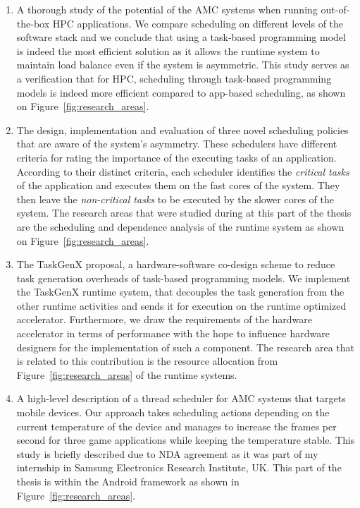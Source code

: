 \begin{enumerate}
	\item A thorough study of the potential of the AMC systems when running out-of-the-box HPC applications.
	We compare scheduling on different levels of the software stack and we conclude that using a task-based programming model is indeed the most efficient solution as it allows the runtime system to maintain load balance even if the system is asymmetric.
	This study serves as a verification that for HPC, scheduling through task-based programming models is indeed more efficient compared to app-based scheduling, as shown on Figure~\ref{fig:research_areas}.
	\item The design, implementation and evaluation of three novel scheduling policies that are aware of the system's asymmetry.
	These schedulers have different criteria for rating the importance of the executing tasks of an application.
	According to their distinct criteria, each scheduler identifies the \textit{critical tasks} of the application and executes them on the fast cores of the system. 
	They then leave the \textit{non-critical tasks} to be executed by the slower cores of the system.
	The research areas that were studied during at this part of the thesis are the scheduling and dependence analysis of the runtime system as shown on Figure~\ref{fig:research_areas}.
	\item The TaskGenX proposal, a hardware-software co-design scheme to reduce task generation overheads of task-based programming models.
	We implement the TaskGenX runtime system, that decouples the task generation from the other runtime activities and sends it for execution on the runtime optimized accelerator.
	Furthermore, we draw the requirements of the hardware accelerator in terms of performance with the hope to influence hardware designers for the implementation of such a component.
	The research area that is related to this contribution is the resource allocation from Figure~\ref{fig:research_areas} of the runtime systems.
	\item A high-level description of a thread scheduler for AMC systems that targets mobile devices.
	Our approach takes scheduling actions depending on the current temperature of the device and manages to increase the frames per second for three game applications while keeping the temperature stable.
	This study is briefly described due to NDA agreement as it was part of my internship in Samsung Electronics Research Institute, UK.
	This part of the thesis is within the Android framework as shown in Figure~\ref{fig:research_areas}.
\end{enumerate}


